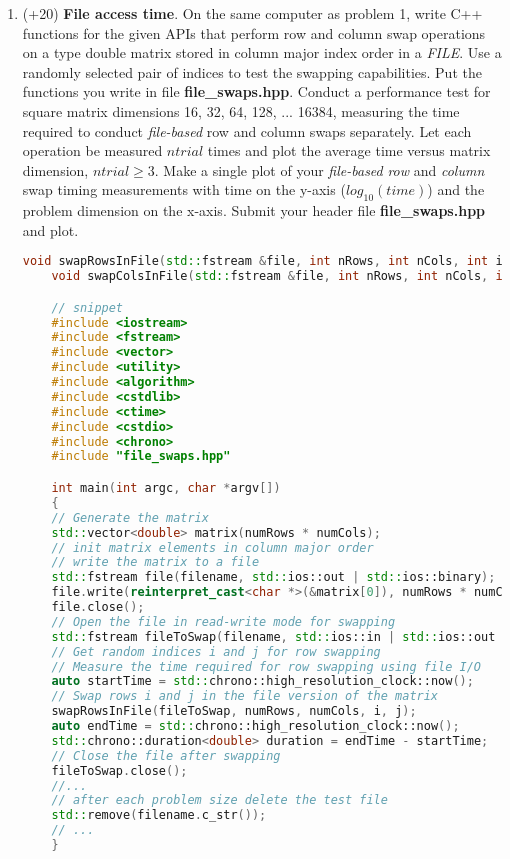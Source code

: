 \documentclass[10pt]{article}
\theoremstyle{definition}
\theoremstyle{remark}
\begin{document}
\begin{enumerate}
\begin{lstlisting}[language=C++]
    \end{lstlisting}

    \item (+20) \textbf{File access time}. On the same computer as problem 1, write C++ functions for the given APIs that perform row and column swap operations on a type double matrix stored in column major index order in a \textit{FILE}. Use a randomly selected pair of indices to test the swapping capabilities. Put the functions you write in file \textbf{file\_swaps.hpp}. Conduct a performance test for square matrix dimensions 16, 32, 64, 128, ... 16384, measuring the time required to conduct \textit{file-based} row and column swaps separately. Let each operation be measured $ntrial$ times and plot the average time versus matrix dimension, $ntrial\geq 3$. Make a single plot of your \textit{file-based} \textit{row} and \textit{column} swap timing measurements with time on the y-axis ($log_{10}(time)$) and the problem dimension on the x-axis. Submit your header file \textbf{file\_swaps.hpp} and plot. 
    \begin{lstlisting}[language=C++]
    void swapRowsInFile(std::fstream &file, int nRows, int nCols, int i, int j);
    void swapColsInFile(std::fstream &file, int nRows, int nCols, int i, int j);

    // snippet 
    #include <iostream>
    #include <fstream>
    #include <vector>
    #include <utility>
    #include <algorithm>
    #include <cstdlib>
    #include <ctime>
    #include <cstdio>
    #include <chrono>
    #include "file_swaps.hpp"

    int main(int argc, char *argv[])
    {
    // Generate the matrix 
    std::vector<double> matrix(numRows * numCols);
    // init matrix elements in column major order
    // write the matrix to a file
    std::fstream file(filename, std::ios::out | std::ios::binary);
    file.write(reinterpret_cast<char *>(&matrix[0]), numRows * numCols * sizeof(double));
    file.close();
    // Open the file in read-write mode for swapping
    std::fstream fileToSwap(filename, std::ios::in | std::ios::out | std::ios::binary);
    // Get random indices i and j for row swapping
    // Measure the time required for row swapping using file I/O
    auto startTime = std::chrono::high_resolution_clock::now();
    // Swap rows i and j in the file version of the matrix
    swapRowsInFile(fileToSwap, numRows, numCols, i, j);
    auto endTime = std::chrono::high_resolution_clock::now();
    std::chrono::duration<double> duration = endTime - startTime;
    // Close the file after swapping
    fileToSwap.close();
    //...
    // after each problem size delete the test file
    std::remove(filename.c_str());
    // ...
    }
    \end{lstlisting}


\end{enumerate}
\end{document}
